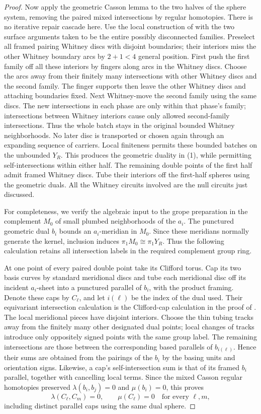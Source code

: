 \documentclass[11pt]{article}
\theoremstyle{definition}
\theoremstyle{remark}
\begin{document}
\begin{proof}
Now apply the geometric Casson lemma to the two halves of the sphere
system, removing the paired mixed intersections by regular homotopies.
There is no iterative repair cascade here.  Use the local construction
of \cite[Lemma~3.3]{PRT} with the two surface arguments taken to be the
entire possibly disconnected families.  Preselect all framed pairing
Whitney discs with disjoint boundaries; their interiors miss the other
Whitney boundary arcs by $2+1<4$ general position.  First push the first
family off all these interiors by fingers along arcs in the Whitney
discs.  Choose the arcs away from their finitely many intersections
with other Whitney discs and the second family.  The finger supports
then leave the other Whitney discs and attaching boundaries fixed.
Next Whitney-move the second family using the same discs.  The new
intersections in each phase are only within that phase's family;
intersections between Whitney interiors cause only allowed
second-family intersections.  Thus the whole batch stays in the
original bounded Whitney neighborhoods.  No later disc is transported
or chosen again through an expanding sequence of carriers.  Local
finiteness permits these bounded batches on the unbounded $Y_R$.
This produces the geometric duality in (1), while permitting
self-intersections within either half.  The remaining double points
of the first half admit framed Whitney discs.  Tube their interiors
off the first-half spheres using the geometric duals.  All the
Whitney circuits involved are the null circuits just discussed.

For completeness, we verify the algebraic input to the grope preparation
in the complement $M_0$ of small plumbed neighborhoods of the $a_i$.
The punctured geometric dual $b_i$ bounds an $a_i$-meridian in $M_0$.
Since these meridians normally generate the kernel, inclusion induces
$\pi_1M_0\cong\pi_1Y_R$.  Thus the following calculation retains all
intersection labels in the required complement group ring.

At one point of every paired double point take its Clifford torus.
Cap its two basis curves by standard meridional discs and tube each
meridional disc off its incident $a_i$-sheet into a punctured parallel
of $b_i$, with the product framing.  Denote these caps by $C_\ell$,
and let $i(\ell)$ be the index of the dual used.  Their equivariant
intersection calculation is the Clifford-cap calculation in the proof
of \cite[Section~5]{PRT}.  The local meridional pieces have disjoint
interiors.  Choose the thin tubing tracks away from the finitely many
other designated dual points; local changes of tracks introduce only
oppositely signed points with the same group label.  The remaining
intersections are those between the corresponding based parallels of
$b_{i(\ell)}$.  Hence their sums are obtained from the pairings of the
$b_i$ by the basing units and orientation signs.  Likewise, a cap's
self-intersection sum is that of its framed $b_i$ parallel, together
with cancelling local terms.  Since the mixed Casson regular homotopies
preserved $\lambda(b_i,b_j)=0$ and $\mu(b_i)=0$, this proves
\[
 \lambda(C_\ell,C_m)=0,\qquad \mu(C_\ell)=0
 \quad\text{for every }\ell,m,
\]
including distinct parallel caps using the same dual sphere.


\end{proof}
\end{document}
